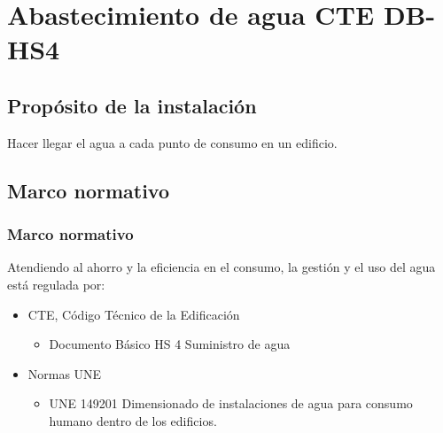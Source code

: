 \chapter{Abastecimiento de agua CTE DB-HS4}
\section{Propósito de la instalación}
Hacer llegar el agua a cada punto de consumo en un edificio.

\section{Marco normativo}
\subsection{Marco normativo}
Atendiendo al ahorro y la eficiencia en el consumo, la gestión y el uso del agua está regulada por:
\begin{itemize}
    \item CTE, Código Técnico de la Edificación
    \begin{itemize}
        \item Documento Básico HS 4 Suministro de agua
    \end{itemize}
    \item Normas UNE
    \begin{itemize}
        \item UNE 149201 Dimensionado de instalaciones de agua para consumo humano dentro de los edificios.
    \end{itemize}
\end{itemize}

